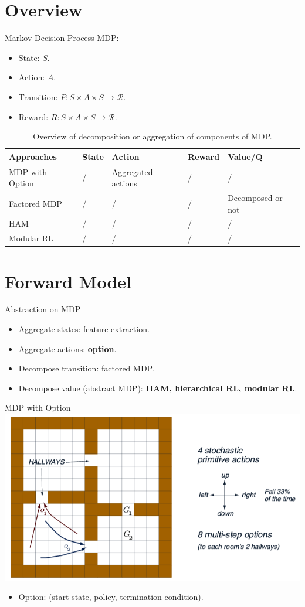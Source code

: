 \section{Overview}

Markov Decision Process
MDP:
\begin{itemize}
\item State: $S$.
\item Action: $A$.
\item Transition: $P: S \times A \times S \rightarrow \mathcal{R}$.
\item Reward: $R: S \times A \times S \rightarrow \mathcal{R}$.
\end{itemize}

\begin{table}
\centering
\begin{tabular}{| l | l | l | l | l |}
  \hline
  Approaches & State & Action & Reward & Value/Q \\
  \hline
  MDP with Option & / & Aggregated actions & / & /\\
  \hline
  Factored MDP & / & / & / & Decomposed or not\\
  \hline
  HAM & / & / & / & / \\
  \hline
  Modular RL & / & / & / & / \\
  \hline
\end{tabular}
\label{tbl:overview}
\caption{Overview of decomposition or aggregation of components of MDP.}
\end{table}

\section{Forward Model}

Abstraction on MDP
\begin{itemize}
  \item Aggregate states: feature extraction. 
  \item Aggregate actions: {\bf option}. 
  \item Decompose transition: factored MDP. 
  \item Decompose value (abstract MDP): {\bf HAM, hierarchical RL, modular RL}.
\end{itemize}



MDP with Option
\includegraphics[width=0.8\columnwidth]{option.png}
\begin{itemize}
  \item Option: (start state, policy, termination condition).
\end{itemize}



